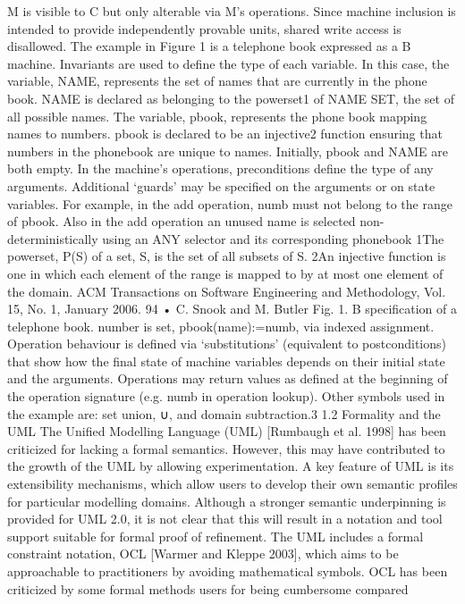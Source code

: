 M is visible to C but only alterable via M’s operations. Since machine inclusion is intended to provide independently provable units, shared write access
is disallowed.
The example in Figure 1 is a telephone book expressed as a B machine.
Invariants are used to define the type of each variable. In this case, the variable, NAME, represents the set of names that are currently in the phone book.
NAME is declared as belonging to the powerset1 of NAME SET, the set of
all possible names. The variable, pbook, represents the phone book mapping
names to numbers. pbook is declared to be an injective2 function ensuring that
numbers in the phonebook are unique to names. Initially, pbook and NAME
are both empty. In the machine’s operations, preconditions define the type
of any arguments. Additional ‘guards’ may be specified on the arguments or
on state variables. For example, in the add operation, numb must not belong
to the range of pbook. Also in the add operation an unused name is selected
non-deterministically using an ANY selector and its corresponding phonebook
1The powerset, P(S) of a set, S, is the set of all subsets of S. 2An injective function is one in which each element of the range is mapped to by at most one element
of the domain.
ACM Transactions on Software Engineering and Methodology, Vol. 15, No. 1, January 2006.
94 • C. Snook and M. Butler
Fig. 1. B specification of a telephone book.
number is set, pbook(name):=numb, via indexed assignment. Operation behaviour is defined via ‘substitutions’ (equivalent to postconditions) that show
how the final state of machine variables depends on their initial state and
the arguments. Operations may return values as defined at the beginning
of the operation signature (e.g. numb in operation lookup). Other symbols used
in the example are: set union, ∪, and domain subtraction.3
1.2 Formality and the UML
The Unified Modelling Language (UML) [Rumbaugh et al. 1998] has been criticized for lacking a formal semantics. However, this may have contributed to
the growth of the UML by allowing experimentation. A key feature of UML is
its extensibility mechanisms, which allow users to develop their own semantic
profiles for particular modelling domains. Although a stronger semantic underpinning is provided for UML 2.0, it is not clear that this will result in a notation
and tool support suitable for formal proof of refinement. The UML includes a
formal constraint notation, OCL [Warmer and Kleppe 2003], which aims to
be approachable to practitioners by avoiding mathematical symbols. OCL has
been criticized by some formal methods users for being cumbersome compared
